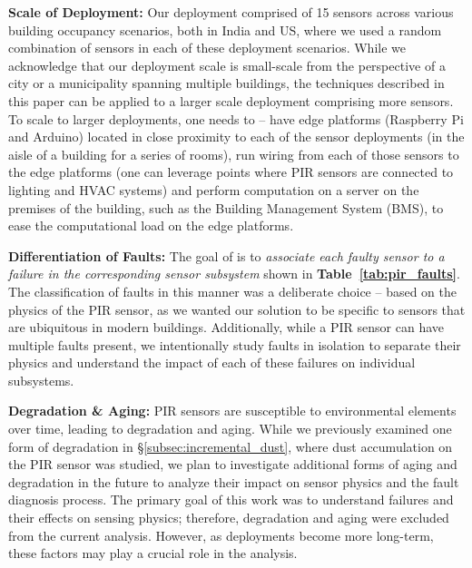 \noindent \textbf{Scale of Deployment:} Our deployment comprised of 15 sensors across various building occupancy scenarios, both in India and US, where we used a random combination of sensors in each of these deployment scenarios. While we acknowledge that our deployment scale is small-scale from the perspective of a city or a municipality spanning multiple buildings, the techniques described in this paper can be applied to a larger scale deployment comprising more sensors. To scale to larger deployments, one needs to -- \ca have edge platforms (Raspberry Pi and Arduino) located in close proximity to each of the sensor deployments (\eg in the aisle of a building for a series of rooms), \cb run wiring from each of those sensors to the edge platforms (\eg one can leverage points where PIR sensors are connected to lighting and HVAC systems) and \cc perform computation on a server on the premises of the building, such as the Building Management System (BMS), to ease the computational load on the edge platforms.

\noindent \textbf{Differentiation of Faults:} The goal of \sol is to {\em associate each faulty sensor to a failure in the corresponding sensor subsystem} shown in {\bfseries Table~\ref{tab:pir_faults}}. The classification of faults in this manner was a deliberate choice -- based on the physics of the PIR sensor, as we wanted our solution to be specific to sensors that are ubiquitous in modern buildings. Additionally, while a PIR sensor can have multiple faults present, we intentionally study faults in isolation to separate their physics and understand the impact of each of these failures on individual subsystems.

\noindent \textbf{Degradation \& Aging:} PIR sensors are susceptible to environmental elements over time, leading to degradation and aging. While we previously examined one form of degradation in \S\ref{subsec:incremental_dust}, where dust accumulation on the PIR sensor was studied, we plan to investigate additional forms of aging and degradation in the future to analyze their impact on sensor physics and the fault diagnosis process. The primary goal of this work was to understand failures and their effects on sensing physics; therefore, degradation and aging were excluded from the current analysis. However, as deployments become more long-term, these factors may play a crucial role in the analysis.


